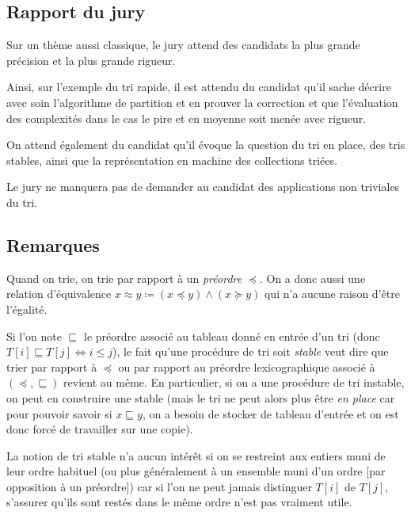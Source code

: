 \documentclass[../../Agregation.tex]{subfiles}
\begin{document}

\subsection{Rapport du jury}

\begin{aquote}{}
Sur un thème aussi classique, le jury attend des candidats la plus grande précision et la plus grande rigueur.

Ainsi, sur l'exemple du tri rapide, il est attendu du candidat qu'il sache décrire avec soin l'algorithme de partition et en prouver la correction et que l'évaluation des complexités dans le cas le pire et en moyenne soit menée avec rigueur.

On attend également du candidat qu'il évoque la question du tri en place, des tris stables, ainsi que la représentation en machine des collections triées.

Le jury ne manquera pas de demander au candidat des applications non triviales du tri.
\end{aquote}

\subsection{Remarques}

Quand on trie, on trie par rapport à un \emph{préordre} $\preccurlyeq$. On a donc aussi une relation d'équivalence $x\approx y\coloneqq (x\preccurlyeq y) \land (x\succcurlyeq y)$ qui n'a aucune raison d'être l'égalité.

Si l'on note $\sqsubseteq$ le préordre associé au tableau donné en entrée d'un tri (donc $T[i]\sqsubseteq T[j] \iff i \le j$), le fait qu'une procédure de tri soit \emph{stable} veut dire que trier par rapport à $\preccurlyeq$ ou par rapport au préordre lexicographique associé à $(\preccurlyeq, \sqsubseteq)$ revient au même. En particulier, si on a une procédure de tri instable, on peut en construire une stable (mais le tri ne peut alors plus être \emph{en place} car pour pouvoir savoir si $x\sqsubseteq y$, on a besoin de stocker de tableau d'entrée et on est donc forcé de travailler sur une copie).

La notion de tri stable n'a aucun intérêt si on se restreint aux entiers muni de leur ordre habituel (ou plus généralement à un ensemble muni d'un ordre [par opposition à un préordre]) car si l'on ne peut jamais distinguer $T[i]$ de $T[j]$, s'assurer qu'ils sont restés dans le même ordre n'est pas vraiment utile.
\end{document}
